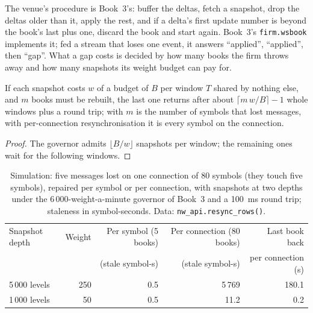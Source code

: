 The venue's procedure is Book~3's: buffer the deltas, fetch a snapshot, drop the deltas older than it, apply the rest, and if a delta's first update
number is beyond the book's last plus one, discard the book and start again. Book~3's \texttt{firm.wsbook} implements it; fed a stream that loses one
event, it answers ``applied'', ``applied'', then ``gap''. What a gap costs is decided by how many books the firm throws away and how many snapshots its
weight budget can pay for.

\begin{proposition}\label{prop:nw:api-engineering-for-crypto-venues:gap}
If each snapshot costs $w$ of a budget of $B$ per window $T$ shared by nothing else, and $m$ books must be rebuilt, the last one returns after about
$\lceil m\,w/B \rceil - 1$ whole windows plus a round trip; with  $m$ is the number of symbols that lost messages, with
per-connection resynchronisation it is every symbol on the connection.
\end{proposition}

\begin{proof}
The governor admits $\lfloor B/w \rfloor$ snapshots per window; the remaining ones wait for the following windows.
\end{proof}

\label{lst:nw:api-engineering-for-crypto-venues:resync}

\begin{table}[ht]
\centering\small
\begin{tabular}{lrrrr}
\toprule
Snapshot depth & Weight & Per symbol (5 books) & Per connection (80 books) & Last book back \\
 & & (stale symbol-s) & (stale symbol-s) & per connection (s) \\
\midrule
5\,000 levels & 250 & 0.5 & 5\,769 & 180.1 \\
1\,000 levels & 50 & 0.5 & 11.2 & 0.2 \\
\bottomrule
\end{tabular}
\caption{Simulation: five messages lost on one connection of 80 symbols (they touch five symbols), repaired per symbol or per connection, with
snapshots at two depths under the 6\,000-weight-a-minute governor of Book~3 and a \qty{100}{\milli\second} round trip; staleness in
symbol-seconds. Data: \texttt{nw\_api.resync\_rows()}.}\label{tab:nw:api-engineering-for-crypto-venues:resync}
\end{table}

